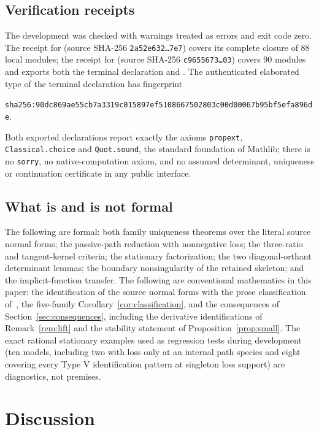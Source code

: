 \documentclass[11pt,a4paper]{article}
\theoremstyle{plain}
\theoremstyle{definition}
\theoremstyle{remark}
\numberwithin{equation}{section}
\newcommand{\V}{\mathrm{V}}
\begin{document}
\subsection*{Verification receipts}
The development was checked with warnings treated as errors and exit code zero. The receipt for  (source SHA-256 \texttt{2a52e632\ldots7e7}) covers its complete closure of 88 local modules; the receipt for  (source SHA-256 \texttt{c9655673\ldots03}) covers 90 modules and exports both the terminal declaration and . The authenticated elaborated type of the terminal declaration has fingerprint
\begin{center}\small\texttt{sha256:90dc869ae55cb7a3319c015897ef5108667502803c00d00067b95bf5efa896de}.\end{center}
Both exported declarations report exactly the axioms \texttt{propext}, \texttt{Classical.choice} and \texttt{Quot.sound}, the standard foundation of Mathlib; there is no \texttt{sorry}, no native-computation axiom, and no assumed determinant, uniqueness or continuation certificate in any public interface.

\subsection*{What is and is not formal}
The following are formal: both family uniqueness theorems over the literal source normal forms; the passive-path reduction with nonnegative loss; the three-ratio and tangent-kernel criteria; the stationary factorization; the two diagonal-orthant determinant lemmas; the boundary nonsingularity of the retained skeleton; and the implicit-function transfer. The following are conventional mathematics in this paper: the identification of the source normal forms with the prose classification of~\cite{NNU26}, the five-family Corollary~\ref{cor:classification}, and the consequences of Section~\ref{sec:consequences}, including the derivative identifications of Remark~\ref{rem:lift} and the stability statement of Proposition~\ref{prop:small}. The exact rational stationary examples used as regression tests during development (ten models, including two with loss only at an internal path species and eight covering every Type $\V$ identification pattern at singleton loss support) are diagnostics, not premises.

\section{Discussion}\label{sec:discussion}
\end{document}

